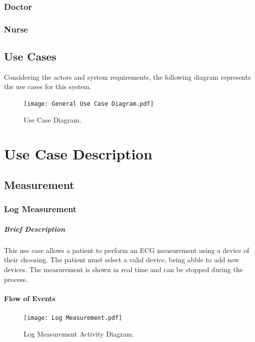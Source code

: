 \documentclass{report}
\begin{document}
\subsection{Doctor}
\subsection{Nurse}

\clearpage
\section{Use Cases}
Considering the actors and system requirements, the following diagram represents the use cases for this system.

\begin{figure}[hb]
    \centering
    \texttt{[image: General Use Case Diagram.pdf]}
    \caption{Use Case Diagram.}
    \label{fig:Use Case}
\end{figure}

\chapter{Use Case Description}
\vspace{-3em}
\section{Measurement}
\subsection{Log Measurement}
\vspace{-1em}
\paragraph{Brief Description}
This use case allows a patient to perform an ECG measurement using a device of their choosing. 
The patient must select a valid device, being abble to add new devices.
The measurement is shown in real time and can be stopped during the process.

\vspace{-1em}
\subsubsection{Flow of Events}
\begin{figure}[ht]
    \centering
    \texttt{[image: Log Measurement.pdf]}
    \caption{Log Measurement Activity Diagram.}
    \label{fig:Log Measure}
\end{figure}
\end{document}
